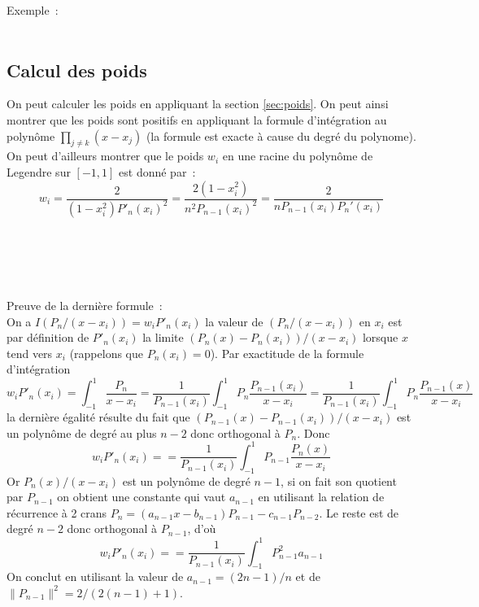 \documentclass[a4paper,11pt]{book}
\begin{document}
\begin{giacjshere}
Exemple~:
\\
\\

\subsection{Calcul des poids}
On peut calculer les poids en appliquant
la section \ref{sec:poids}. On peut ainsi montrer
que les poids sont positifs en appliquant la formule
d'int\'egration au polyn\^ome
$\prod_{j\neq k}(x-x_j)$
(la formule est exacte \`a cause du degr\'e du polynome).
On peut d'ailleurs montrer que le poids $w_i$ 
en une racine du polyn\^ome de Legendre
sur $[-1,1]$ est donn\'e par~:
$$ w_i=\frac{2}{(1-x_i^2)P'_n(x_i)^2} = \frac{2(1-x_i^2)}{n^2P_{n-1}(x_i)^2}=\frac{2}{nP_{n-1}(x_i)P_n'(x_i)}$$
\\
\\
\\
\\
\\
Preuve de la derni\`ere formule~:\\
On a $I(P_n/(x-x_i))=w_i P'_n(x_i)$ la valeur de $(P_n/(x-x_i))$
en $x_i$ est par d\'efinition de $P'_n(x_i)$ la limite $(P_n(x)-P_n(x_i))/(x-x_i)$
lorsque $x$ tend vers $x_i$ (rappelons que $P_n(x_i)=0$).
Par exactitude de la formule d'int\'egration
$$w_i P'_n(x_i)=\int_{-1}^1 \frac{P_n}{x-x_i} =
\frac1{P_{n-1}(x_i)}\int_{-1}^1 P_n \frac{P_{n-1}(x_i)}{x-x_i} 
= \frac1{P_{n-1}(x_i)}\int_{-1}^1 P_n \frac{P_{n-1}(x)}{x-x_i} $$
la derni\`ere \'egalit\'e r\'esulte du fait que
$(P_{n-1}(x)-P_{n-1}(x_i))/(x-x_i)$
est un polyn\^ome de degr\'e au plus $n-2$ donc orthogonal \`a $P_n$.
Donc
$$w_i P'_n(x_i)=
= \frac1{P_{n-1}(x_i)}\int_{-1}^1 P_{n-1} \frac{P_n(x)}{x-x_i} $$
Or $P_n(x)/(x-x_i)$ est un polyn\^ome de degr\'e $n-1$, si on fait son
quotient par $P_{n-1}$ on obtient une constante qui vaut $a_{n-1}$ en
utilisant la relation de r\'ecurrence \`a 2 crans
$P_n=(a_{n-1}x-b_{n-1})P_{n-1}-c_{n-1}P_{n-2}$. Le reste est de
degr\'e $n-2$ donc orthogonal \`a $P_{n-1}$, d'o\`u
$$w_i P'_n(x_i)=
= \frac1{P_{n-1}(x_i)}\int_{-1}^1 P_{n-1}^2 a_{n-1} $$
On conclut en utilisant la valeur de $a_{n-1}=(2n-1)/n$ et de
$\| P_{n-1}\|^2=2/(2(n-1)+1)$.


\end{giacjshere}
\end{document}
